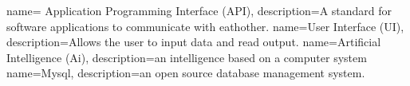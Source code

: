 {
    name= Application Programming Interface (API),
    description={A standard for software applications to communicate with eathother.}
}
{
    name=User Interface (UI),
    description={Allows the user to input data and read output.}
}
{
    name=Artificial Intelligence (Ai),
    description={an intelligence based on a computer system}
}
{
    name=Mysql,
    description={an open source database management system.}
}

